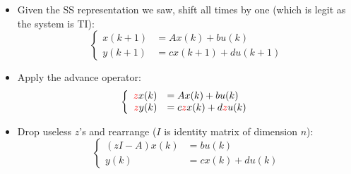 \begin{frame}
\framesubtitleTC{}
\myPause
 \begin{itemize}[<+-| alert@+>]
 \item Given the SS representation we saw, shift all times by one (which is legit as the system is TI):
       \begin{displaymath}
        \left\{
         \begin{array}{rlll}
          x(k+1) &= A x(k)   + b u(k)\\
          y(k+1) &= c x(k+1) + d u(k+1) 
         \end{array}
        \right.
       \end{displaymath} 
 \item Apply the advance operator:
       \begin{displaymath}
        \left\{
         \begin{array}{rl}
          \textcolor{red}{z}x(k) &= A x(k) + b u(k)\\
          \textcolor{red}{z}y(k) &= c \textcolor{red}{z}x(k) + d\textcolor{red}{z} u(k)
         \end{array}
        \right.
       \end{displaymath} 
 \item Drop useless $z$'s and rearrange ($I$ is identity matrix of dimension $n$):
       \begin{displaymath}
        \left\{
         \begin{array}{rl}
          (zI-A)x(k) &= b u(k)\\
          y(k)       &= c x(k) + d u(k)
         \end{array}
        \right.
       \end{displaymath} 
 \end{itemize}
\end{frame}

